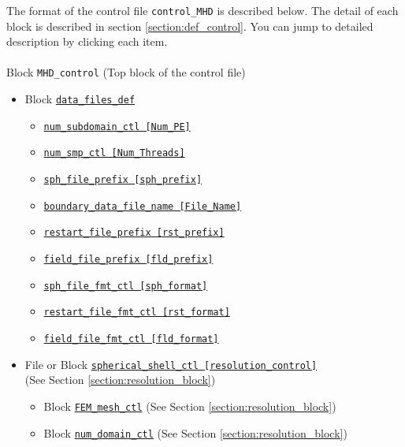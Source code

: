 The format of the control file \verb|control_MHD| is described below. The detail of each block is described in section \ref{section:def_control}. You can jump to detailed description by clicking each item. \\
\\
%
Block \verb|MHD_control|  (Top block of the control file)
\label{href_i:MHD_control}
%
\begin{itemize}
\item Block \hyperref[href_t:data_files_def]{\tt data\_files\_def}
	\label{href_i:data_files_def}
%
	\begin{itemize}
	\item \hyperref[href_t:num_subdomain_ctl]
			{\tt num\_subdomain\_ctl    [Num\_PE]}
	\item \hyperref[href_t:num_smp_ctl]
			{\tt num\_smp\_ctl    [Num\_Threads]}
	\item \hyperref[href_t:sph_file_prefix]
			{\tt sph\_file\_prefix    [sph\_prefix]}
	\item \hyperref[href_t:boundary_data_file_name]
		{\tt boundary\_data\_file\_name    [File_Name]}
%
	\item \hyperref[href_t:restart_file_prefix]
		{\tt restart\_file\_prefix    [rst\_prefix]}
	\item \hyperref[href_t:field_file_prefix]
			{\tt field\_file\_prefix    [fld\_prefix]}
%
	\item \hyperref[href_t:sph_file_fmt_ctl]
			{\tt sph\_file\_fmt\_ctl    [sph\_format]}
	\item \hyperref[href_t:restart_file_fmt_ctl]
			{\tt restart\_file\_fmt\_ctl    [rst\_format]}
	\item \hyperref[href_t:field_file_fmt_ctl]
			{\tt field\_file\_fmt\_ctl    [fld\_format]}
	\end{itemize}
%
\item File or Block \hyperref[href_i:spherical_shell_ctl]
			{\tt spherical\_shell\_ctl        [resolution\_control]}  \\
			 (See Section \ref{section:resolution_block})
	\begin{itemize}
	\item Block \hyperref[href_i:FEM_mesh_ctl]
        {\tt FEM\_mesh\_ctl} (See Section \ref{section:resolution_block})
	\item Block \hyperref[href_i:num_domain_ctl]
		{\tt num\_domain\_ctl} (See Section \ref{section:resolution_block})

\end{itemize}
\end{itemize}
